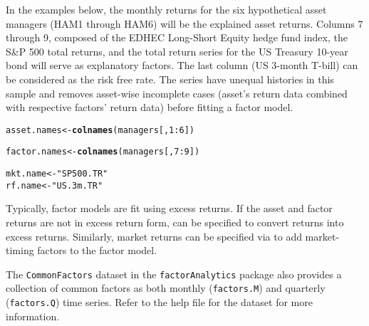 \documentclass[a4paper]{article}\usepackage[]{graphicx}\usepackage[]{color}
\makeatletter
\newcommand{\hlnum}[1]{\textcolor[rgb]{0.686,0.059,0.569}{#1}}%
\newcommand{\hlstr}[1]{\textcolor[rgb]{0.192,0.494,0.8}{#1}}%
\newcommand{\hlopt}[1]{\textcolor[rgb]{0,0,0}{#1}}%
\newcommand{\hlstd}[1]{\textcolor[rgb]{0.345,0.345,0.345}{#1}}%
\newcommand{\hlkwb}[1]{\textcolor[rgb]{0.69,0.353,0.396}{#1}}%
\newcommand{\hlkwd}[1]{\textcolor[rgb]{0.737,0.353,0.396}{\textbf{#1}}}%
\newenvironment{kframe}{%
 \def\at@end@of@kframe{}%
 \ifinner\ifhmode%
  \def\at@end@of@kframe{\end{minipage}}%
  \begin{minipage}{\columnwidth}%
 \fi\fi%
 \def\FrameCommand##1{\hskip\@totalleftmargin \hskip-\fboxsep
 \colorbox{shadecolor}{##1}\hskip-\fboxsep
     \hskip-\linewidth \hskip-\@totalleftmargin \hskip\columnwidth}%
 \MakeFramed {\advance\hsize-\width
   \@totalleftmargin\z@ \linewidth\hsize
   \@setminipage}}%
 {\par\unskip\endMakeFramed%
 \at@end@of@kframe}
\newenvironment{knitrout}{}{} %
\makeatother
\begin{document}
In the examples below, the monthly returns for the six hypothetical asset managers (HAM1 through HAM6) will be the explained asset returns. Columns 7 through 9, composed of the EDHEC Long-Short Equity hedge fund index, the S\&P 500 total returns, and the total return series for the US Treasury 10-year bond will serve as explanatory factors. The last column (US 3-month T-bill) can be considered as the risk free rate. The series have unequal histories in this sample and  removes asset-wise incomplete cases (asset's return data combined with respective factors' return data) before fitting a factor model.
\begin{knitrout}
\color{fgcolor}\begin{kframe}
\begin{alltt}
\hlstd{asset.names} \hlkwb{<-} \hlkwd{colnames}\hlstd{(managers[,}\hlnum{1}\hlopt{:}\hlnum{6}\hlstd{])}
\end{alltt}


{\ttfamily\noindent\bfseries\color{errorcolor}{\#\# Error in is.data.frame(x): object 'managers' not found}}\begin{alltt}
\hlstd{factor.names} \hlkwb{<-} \hlkwd{colnames}\hlstd{(managers[,}\hlnum{7}\hlopt{:}\hlnum{9}\hlstd{])}
\end{alltt}


{\ttfamily\noindent\bfseries\color{errorcolor}{\#\# Error in is.data.frame(x): object 'managers' not found}}\begin{alltt}
\hlstd{mkt.name} \hlkwb{<-} \hlstr{"SP500.TR"}
\hlstd{rf.name} \hlkwb{<-} \hlstr{"US.3m.TR"}
\end{alltt}
\end{kframe}
\end{knitrout}

Typically, factor models are fit using excess returns. If the asset and factor returns are not in excess return form,  can be specified to convert returns into excess returns. Similarly, market returns can be specified via  to add market-timing factors to the factor model.

The \verb"CommonFactors" dataset in the \verb"factorAnalytics" package also provides a collection of common factors as both monthly (\verb"factors.M") and quarterly (\verb"factors.Q") time series. Refer to the help file for the dataset for more information.
\end{document}
